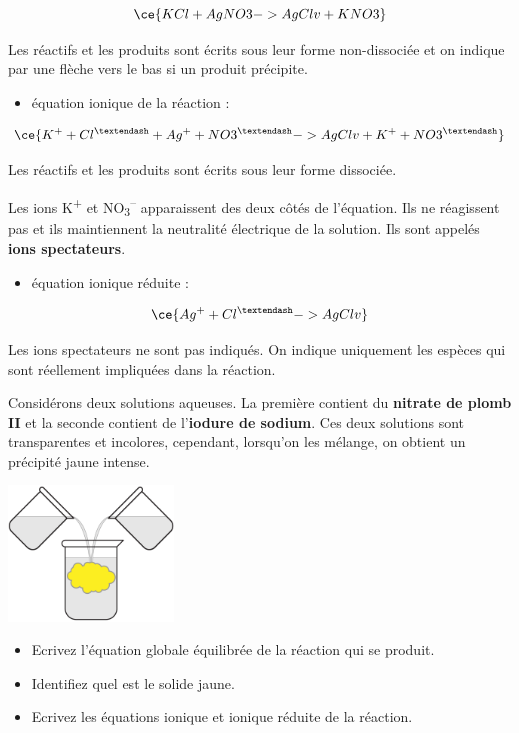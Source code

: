 \documentclass[
  11pt,
  a4paper,
  openany]{book}
\providecommand{\tightlist}{%
  \setlength{\itemsep}{0pt}\setlength{\parskip}{0pt}}
\begin{document}
\[ \ce{KCl + AgNO3 -> AgCl v + KNO3} \]

Les réactifs et les produits sont écrits sous leur forme non-dissociée et on indique par une flèche vers le bas si un produit précipite.

\begin{itemize}
\tightlist
\item
  équation ionique de la réaction :
\end{itemize}

\[ \ce{K^{+} + Cl^{–} + Ag^{+} + NO3^{–} -> AgCl v + K^{+} + NO3^{–}} \]

Les réactifs et les produits sont écrits sous leur forme dissociée.

Les ions K\textsuperscript{+} et NO\textsubscript{3}\textsuperscript{--} apparaissent des deux côtés de l'équation. Ils ne réagissent pas et ils maintiennent la neutralité électrique de la solution. Ils sont appelés \textbf{ions spectateurs}.

\begin{itemize}
\tightlist
\item
  équation ionique réduite :
\end{itemize}

\[ \ce{Ag^{+} + Cl^{–} -> AgCl v} \]

Les ions spectateurs ne sont pas indiqués. On indique uniquement les espèces qui sont réellement impliquées dans la réaction.

\begin{Exercise}

Considérons deux solutions aqueuses. La première contient du \textbf{nitrate de plomb II} et la seconde contient de l'\textbf{iodure de sodium}. Ces deux solutions sont transparentes et incolores, cependant, lorsqu'on les mélange, on obtient un précipité jaune intense.

\includegraphics[width=0.33\textwidth,height=\textheight]{images/precipitation.png}

\begin{itemize}
\tightlist
\item
  Ecrivez l'équation globale équilibrée de la réaction qui se produit.
\item
  Identifiez quel est le solide jaune.
\item
  Ecrivez les équations ionique et ionique réduite de la réaction.
\end{itemize}


\end{Exercise}
\end{document}
